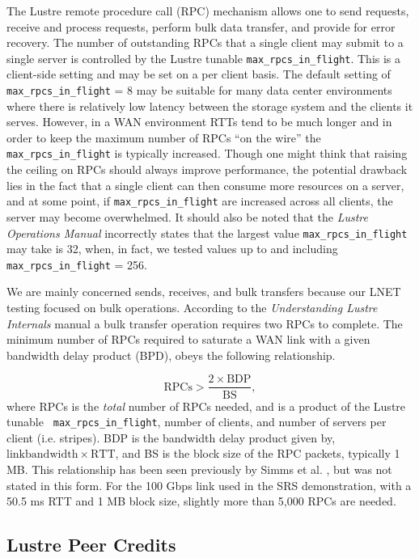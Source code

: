 \documentclass[]{sigplan-proc}
\begin{document}
The Lustre remote procedure call (RPC) mechanism allows one to send requests, receive and process requests,
perform bulk data transfer, and provide for error recovery. The number of outstanding RPCs that a single
client may submit to a single server is controlled by the Lustre tunable {\tt max\_rpcs\_in\_flight}. This is
a client-side setting and may be set on a per client basis. The default setting of {\tt max\_rpcs\_in\_flight}
= 8 may be suitable for many data center environments where there is relatively low latency between the
storage system and the clients it serves. However, in a WAN environment RTTs tend to be much longer and in
order to keep the maximum number of RPCs ``on the wire'' the {\tt max\_rpcs\_in\_flight} is typically
increased. Though one might think that raising the ceiling on RPCs should always improve performance, the
potential drawback lies in the fact that a single client can then consume more resources on a server, and at
some point, if {\tt max\_rpcs\_in\_flight} are increased across all clients, the server may become
overwhelmed. It should also be noted that the {\it Lustre Operations Manual} \cite{LustreManual2012} incorrectly
states that the largest value {\tt max\_rpcs\_in\_flight} may take is 32, when, in fact, we tested values up
to and including {\tt max\_rpcs\_in\_flight} = 256.

We are mainly concerned sends, receives, and bulk transfers because our LNET testing focused on bulk
operations. According to the {\it Understanding Lustre Internals} manual \cite{lustreint2009} a bulk transfer
operation requires two RPCs to complete. The minimum number of RPCs required to saturate a WAN link with a
given bandwidth delay product (BPD), obeys the following relationship.

\begin{equation}
\mathrm{RPCs > \frac{2\times BDP}{BS},}
\label{eq:rpcs}
\end{equation}
where RPCs is the {\it total} number of RPCs needed, and is a product of the Lustre tunable {\tt
  max\_rpcs\_in\_flight}, number of clients, and number of servers per client (i.e. stripes). BDP is the
bandwidth delay product given by, $\mathrm{link bandwidth \times RTT}$, and BS is the block size of the RPC
packets, typically 1 MB. This relationship has been seen previously by Simms et al. \cite{simms2007}, but was
not stated in this form. For the 100 Gbps link used in the SRS demonstration, with a 50.5 ms RTT and 1 MB
block size, slightly more than 5,000 RPCs are needed. 

\subsection{Lustre Peer Credits}
\end{document}
